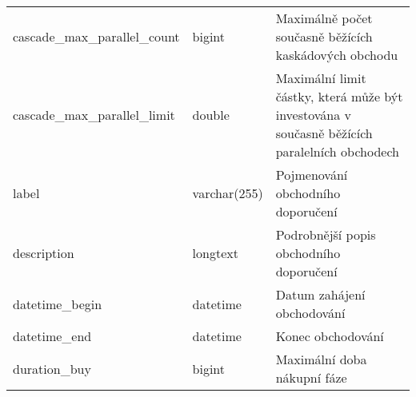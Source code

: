 \begin{center}
\begin{longtable}[h]{|l|C{4cm}|p{4cm}|}
        cascade\_max\_parallel\_count         & bigint                                                                                                                                                           & Maximálně počet současně běžících kaskádových obchodu                                                                             \\
        cascade\_max\_parallel\_limit         & double                                                                                                                                                           & Maximální limit částky, která může být investována v současně běžících paralelních obchodech                                      \\
        label                                 & varchar(255)                                                                                                                                                     & Pojmenování obchodního doporučení                                                                                                 \\
        description                           & longtext                                                                                                                                                         & Podrobnější popis obchodního doporučení                                                                                           \\
        datetime\_begin                       & datetime                                                                                                                                                         & Datum zahájení obchodování                                                                                                        \\
        datetime\_end                         & datetime                                                                                                                                                         & Konec obchodování                                                                                                                 \\
        duration\_buy                         & bigint                                                                                                                                                           & Maximální doba nákupní fáze                                                                                                       \\

\end{longtable}
\end{center}

